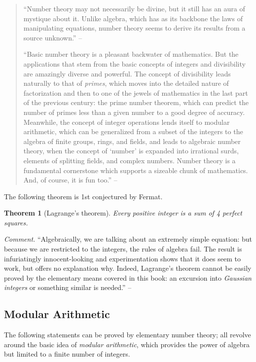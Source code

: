 \documentclass{article}
\numberwithin{equation}{section}
\newtheorem{theorem}{Theorem}[section]
\begin{document}
\begin{quotation}
	``Number theory may not necessarily be divine, but it still has an aura of mystique about it. Unlike algebra, which has as its backbone the laws of manipulating equations, number theory seems to derive its results from a source unknown.'' -- \cite[Chap. 2, p. 9]{Tao2006}
	
	``Basic number theory is a pleasant backwater of mathematics. But the applications that stem from the basic concepts of integers and divisibility are amazingly diverse and powerful. The concept of divisibility leads naturally to that of \textit{primes}, which moves into the detailed nature of factorization and then to one of the jewels of mathematics in the last part of the previous century: the prime number theorem, which can predict the number of primes less than a given number to a good degree of accuracy. Meanwhile, the concept of integer operations lends itself to modular arithmetic, which can be generalized from a subset of the integers to the algebra of finite groups, rings, and fields, and leads to algebraic number theory, when the concept of `number' is expanded into irrational surds, elements of splitting 	fields, and complex numbers. Number theory is a fundamental cornerstone which supports a sizeable chunk of mathematics. And, of course, it is fun too.'' -- \cite[Chap. 2, p. 10]{Tao2006}
\end{quotation}
The following theorem is 1st conjectured by Fermat.

\begin{theorem}[Lagrange's theorem]
	Every positive integer is a sum of 4 perfect squares.
\end{theorem}
\textit{Comment.} ``Algebraically, we are talking about an extremely simple equation: but because we are restricted to the integers, the rules of algebra fail. The result is infuriatingly innocent-looking and experimentation shows that it does seem to work, but offers no explanation why. Indeed, Lagrange's theorem cannot be easily proved by the elementary means covered in this book: an excursion into \textit{Gaussian integers} or something similar is needed.'' -- \cite[Chap. 2, p. 9]{Tao2006}

\subsection{Modular Arithmetic}
The following statements can be proved by elementary number theory; all revolve around the basic idea of \textit{modular arithmetic}, which provides the power of algebra but limited to a finite number of integers.
\end{document}
